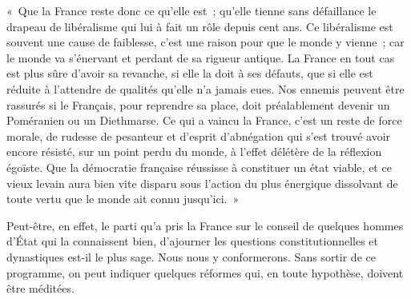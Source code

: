 \documentclass[french,twoside]{book} %
\newenvironment{quoteblock}%
  {\begin{quoting}}
  {\end{quoting}}
\newenvironment{quotebar}{%
    \def\FrameCommand{{\color{rubric!10!}\vrule width 0.5em} \hspace{0.9em}}%
    \def\OuterFrameSep{\itemsep} %
    \MakeFramed {\advance\hsize-\width \FrameRestore}
  }%
  {%
    \endMakeFramed
  }
\renewenvironment{quoteblock}%
  {%
    \savenotes
    \setstretch{0.9}
    \normalfont
    \begin{quotebar}
  }
  {%
    \end{quotebar}
    \spewnotes
  }
\begin{document}
\begin{quoteblock}
 « Que la France reste donc ce qu’elle est ; qu’elle tienne sans défaillance le drapeau de libéralisme qui lui à fait un rôle depuis cent ans. Ce libéralisme est souvent une cause de faiblesse, c’est une raison pour que le monde y vienne ; car le monde va s’énervant et perdant de sa rigueur antique. La France en tout cas est plus sûre d’avoir sa revanche, si elle la doit à ses défauts, que si elle est réduite à l’attendre de qualités qu’elle n’a jamais eues. Nos ennemis peuvent être rassurés si le Français, pour reprendre sa place, doit préalablement devenir un Poméranien ou un Diethmarse. Ce qui a vaincu la France, c’est un reste de force morale, de rudesse de pesanteur et d’esprit d’abnégation qui s’est trouvé avoir encore résisté, sur un point perdu du monde, à l’effet délétère de la réflexion égoïste. Que la démocratie française réussisse à constituer un état viable, et ce vieux levain aura bien vite disparu sous l’action du plus énergique dissolvant de toute vertu que le monde ait connu jusqu’ici. » 
 \end{quoteblock}

\noindent Peut-être, en effet, le parti qu’a pris la France sur le conseil de quelques hommes d’État qui la connaissent bien, d’ajourner les questions constitutionnelles et dynastiques est-il le plus sage. Nous nous y conformerons. Sans sortir de ce programme, on peut indiquer quelques réformes qui, en toute hypothèse, doivent être méditées.
\end{document}
